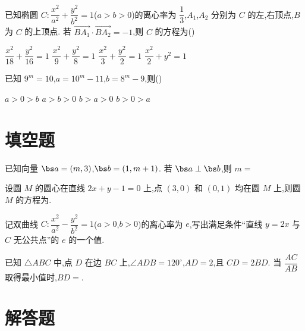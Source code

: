 \begin{problem}
已知椭圆 \(C:\dfrac{x^2}{a^2}+\dfrac{y^2}{b^2}=1\)(\(a>b>0\))的离心率为 \(\dfrac{1}{3}\),\(A_1\),\(A_2\) 分别为 \(C\) 的左,右顶点,\(B\) 为 \(C\) 的上顶点. 若 \(\overrightarrow{BA_1}\cdot\overrightarrow{BA_2}=-1\),则 \(C\) 的方程为(\quad)

\choices
    {\(\dfrac{x^2}{18}+\dfrac{y^2}{16}=1\)}
    {\(\dfrac{x^2}{9}+\dfrac{y^2}{8}=1\)}
    {\(\dfrac{x^2}{3}+\dfrac{y^2}{2}=1\)}
    {\(\dfrac{x^2}{2}+y^2=1\)}
\end{problem}

\begin{problem}
已知 \(9^m=10\),\(a=10^m-11\),\(b=8^m-9\),则(\quad)

\choices
    {\(a>0>b\)}
    {\(a>b>0\)}
    {\(b>a>0\)}
    {\(b>0>a\)}
\end{problem}

\section{填空题}

\begin{problem}
已知向量 \(\bs a=\left(m,3\right)\),\(\bs b=\left(1,m+1\right)\). 若 \(\bs a\perp\bs b\),则 \(m=\)\fillinblank{}
\end{problem}

\begin{problem}
设圆 \(M\) 的圆心在直线 \(2x+y-1=0\) 上,点 \(\left(3,0\right)\) 和 \(\left(0,1\right)\) 均在圆 \(M\) 上,则圆 \(M\) 的方程为\fillinblank{}.
\end{problem}

\begin{problem}
记双曲线 \(C:\dfrac{x^2}{a^2}-\dfrac{y^2}{b^2}=1\)(\(a>0\),\(b>0\))的离心率为 \(e\),写出满足条件``直线 \(y=2x\) 与 \(C\) 无公共点''的 \(e\) 的一个值\fillinblank{}.
\end{problem}

\begin{problem}
已知 \(\triangle ABC\) 中,点 \(D\) 在边 \(BC\) 上,\(\angle ADB=120^\circ\),\(AD=2\),且 \(CD=2BD\). 当 \(\dfrac{AC}{AB}\) 取得最小值时,\(BD=\)\fillinblank{}.
\end{problem}

\section{解答题}

